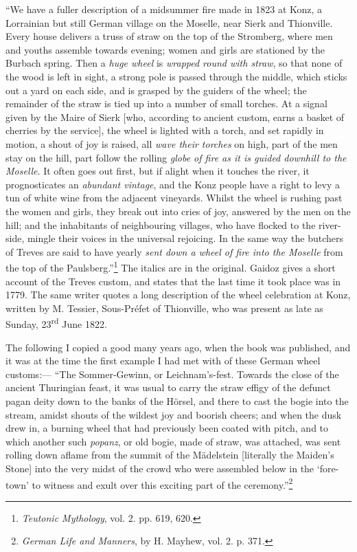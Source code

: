 \documentclass[a4paper, 11pt, oneside, polutonikogreek, english]{article}
\begin{document}
``We have a fuller description of a midsummer fire made in 1823 at Konz, a Lorrainian but still German village on the Moselle, near Sierk and Thionville. Every house delivers a truss of straw on the top of the Stromberg, where men and youths assemble towards evening; women and girls are stationed by the Burbach spring. Then a \emph{huge wheel} is \emph{wrapped round with straw}, so that none of the wood is left in sight, a strong pole is passed through the middle, which sticks out a yard on each side, and is grasped by the guiders of the wheel; the remainder of the straw is tied up into a number of small torches. At a signal given by the Maire of Sierk [who, according to ancient custom, earns a basket of cherries by the service], the wheel is lighted with a torch, and set rapidly in motion, a shout of joy is raised, all \emph{wave their torches} on high, part of the men stay on the hill, part follow the rolling \emph{globe of fire as it is guided downhill to the Moselle}. It often goes out first, but if alight when it touches the river, it prognosticates an \emph{abundant vintage}, and the Konz people have a right to levy a tun of white wine from the adjacent vineyards. Whilst the wheel is rushing past the women and girls, they break out into cries of joy, answered by the men on the hill; and the inhabitants of neighbouring villages, who have flocked to the river-side, mingle their voices in the universal rejoicing. In the same way the butchers of Treves are said to have yearly \emph{sent down a wheel of fire into the Moselle} from the top of the Paulsberg.''\footnote{\emph{Teutonic Mythology}, vol. 2. pp. 619, 620.} The italics are in the original. Gaidoz gives a short account of the Treves custom, and states that the last time it took place was in 1779. The same writer quotes a long description of the wheel celebration at Konz, written by M. Tessier, Sous-Préfet of Thionville, who was present as late as Sunday, 23\textsuperscript{rd} June 1822.

The following I copied a good many years ago, when the book was published, and it was at the time the first example I had met with of these German wheel customs:--- ``The Sommer-Gewinn, or Leichnam's-fest. Towards the close of the ancient Thuringian feast, it was usual to carry the straw effigy of the defunct pagan deity down to the banks of the Hörsel, and there to cast the bogie into the stream, amidst shouts of the wildest joy and boorish cheers; and when the dusk drew in, a burning wheel that had previously been coated with pitch, and to which another such \emph{popanz}, or old bogie, made of straw, was attached, was sent rolling down aflame from the summit of the Mädelstein [literally the Maiden's Stone] into the very midst of the crowd who were assembled below in the `fore-town' to witness and exult over this exciting part of the ceremony.''\footnote{\emph{German Life and Manners}, by H. Mayhew, vol. 2. p. 371.}
\end{document}
